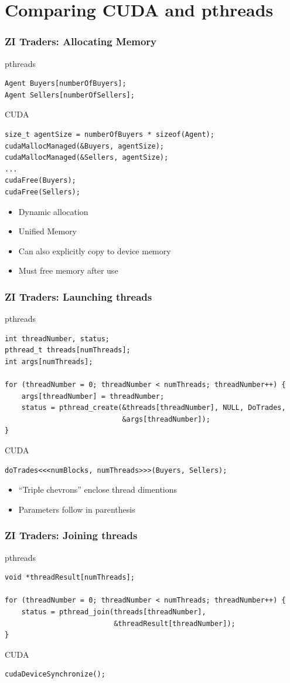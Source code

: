 \documentclass[handout]{beamer}
\begin{document}
\section{Comparing CUDA and pthreads}
\begin{frame}[fragile]
  \frametitle{ZI Traders: Allocating Memory}
  pthreads
\begin{lstlisting}[frame=single]
Agent Buyers[numberOfBuyers];
Agent Sellers[numberOfSellers];
\end{lstlisting}

  CUDA
\begin{lstlisting}[frame=single]
size_t agentSize = numberOfBuyers * sizeof(Agent);
cudaMallocManaged(&Buyers, agentSize);
cudaMallocManaged(&Sellers, agentSize);
...
cudaFree(Buyers);
cudaFree(Sellers);
\end{lstlisting}
  \begin{itemize}
  \item Dynamic allocation
  \item Unified Memory
  \item Can also explicitly copy to device memory
  \item Must free memory after use
  \end{itemize}
\end{frame}

\begin{frame}[fragile]
  \frametitle{ZI Traders: Launching threads}
  pthreads
\begin{lstlisting}[frame=single]
int threadNumber, status;
pthread_t threads[numThreads];
int args[numThreads];

for (threadNumber = 0; threadNumber < numThreads; threadNumber++) {
    args[threadNumber] = threadNumber;
    status = pthread_create(&threads[threadNumber], NULL, DoTrades,
                            &args[threadNumber]);
}
\end{lstlisting}

  CUDA
\begin{lstlisting}[frame=single]
doTrades<<<numBlocks, numThreads>>>(Buyers, Sellers);
\end{lstlisting}
  \begin{itemize}
  \item ``Triple chevrons'' enclose thread dimentions
  \item Parameters follow in parenthesis
  \end{itemize}
\end{frame}

\begin{frame}[fragile]
  \frametitle{ZI Traders: Joining threads}
  pthreads
\begin{lstlisting}[frame=single]
void *threadResult[numThreads];

for (threadNumber = 0; threadNumber < numThreads; threadNumber++) {
    status = pthread_join(threads[threadNumber],
                          &threadResult[threadNumber]);
}
\end{lstlisting}

  CUDA
\begin{lstlisting}[frame=single]
cudaDeviceSynchronize();
\end{lstlisting}
\end{frame}
\end{document}
